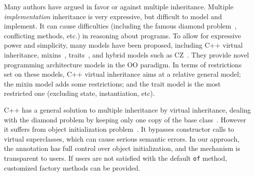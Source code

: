Many authors have argued in favor or against multiple inheritance.
Multiple \emph{implementation}
inheritance is very expressive, but difficult to model and implement. It can
cause difficulties (including the famous diamond
problem~\cite{bracha90mixin,Sak89dis}, conflicting methods, etc.) in reasoning about
programs. To allow for expressive power and simplicity, many
models have been proposed, including C++ virtual inheritance,
mixins~\cite{bracha90mixin}, traits~\cite{scharli03traits}, and hybrid models
such as CZ~\cite{malayeri2009cz}.  They provide novel programming architecture
models in the OO paradigm. In terms of restrictions set on these models, C++
virtual inheritance aims at a relative general model; the mixin model adds some
restrictions; and the trait model is the most restricted one (excluding
state, instantiation, etc).

C++ has a general solution to multiple inheritance by
virtual inheritance, dealing with the diamond problem by keeping only
one copy of the base class~\cite{ellis1990annotated}. However it
suffers from object initialization problem~\cite{malayeri2009cz}.
It bypasses constructor calls to virtual superclasses, which can
cause serious semantic errors. In our approach, the \mixin
annotation has full control over object initialization,
and the mechanism is transparent to users. If users are not satisfied with the default
 \texttt{of} method, customized factory methods can be provided.

